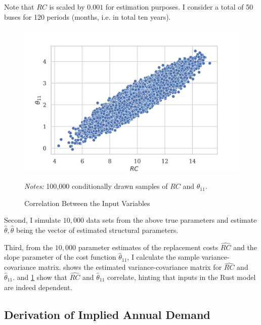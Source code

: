 \noindent Note that $RC$ is scaled by $0.001$ for estimation purposes. I consider a total of 50 buses for 120 periods (months, i.e. in total ten years).

\begin{figure}[t]
	\caption{Correlation Between the Input Variables}
    \label{correlation}
	\vspace*{-4mm}
	\begin{centering}
	\includegraphics[scale=0.9]{../figures/correlation_rc_theta.png}
	\end{centering}

	\small
	\textit{Notes:} 100,000 conditionally drawn samples of $RC$ and $\theta_{11}$.

\end{figure}


Second, I simulate $10,000$ data sets from the above true parameters and estimate $\hat{\theta}, \hat{\theta}$ being the vector of estimated structural parameters.

Third, from the $10,000$ parameter estimates of the replacement costs $\widehat{RC}$ and the slope parameter of the cost function ${\hat{\theta}}_{11}$, I calculate the sample variance-covariance matrix.  shows the estimated variance-covariance matrix for $\widehat{RC}$ and ${\hat{\theta}}_{11}$.  and \cref{correlation} show that $\widehat{RC}$ and ${\hat{\theta}}_{11}$ correlate, hinting that inputs in the Rust model are indeed dependent.

\subsection{Derivation of Implied Annual Demand}


